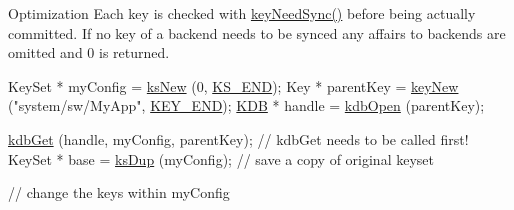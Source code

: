 \begin{DoxyParagraph}{Optimization}
Each key is checked with \hyperlink{group__keytest_gaf247df0de7aca04b32ef80e39ef12950}{key\+Need\+Sync()} before being actually committed. If no key of a backend needs to be synced any affairs to backends are omitted and 0 is returned.
\end{DoxyParagraph}

\begin{DoxyCodeInclude}
KeySet * myConfig = \hyperlink{group__keyset_ga671e1aaee3ae9dc13b4834a4ddbd2c3c}{ksNew} (0, \hyperlink{kdbenum_8c_a7a28fce3773b2c873c94ac80b8b4cd54}{KS\_END});
Key * parentKey = \hyperlink{group__key_gad23c65b44bf48d773759e1f9a4d43b89}{keyNew} (\textcolor{stringliteral}{"system/sw/MyApp"}, \hyperlink{group__key_gga91fb3178848bd682000958089abbaf40aa8adb6fcb92dec58fb19410eacfdd403}{KEY\_END});
\hyperlink{classkdb_1_1KDB_a7e0637995ce9f294cdbc6f167df6db40}{KDB} * handle = \hyperlink{group__kdb_ga6808defe5870f328dd17910aacbdc6ca}{kdbOpen} (parentKey);

\hyperlink{group__kdb_ga28e385fd9cb7ccfe0b2f1ed2f62453a1}{kdbGet} (handle, myConfig, parentKey); \textcolor{comment}{// kdbGet needs to be called first!}
KeySet * base = \hyperlink{group__keyset_gac59e4b328245463f1451f68d5106151c}{ksDup} (myConfig);     \textcolor{comment}{// save a copy of original keyset}

\textcolor{comment}{// change the keys within myConfig}


\end{DoxyCodeInclude}
